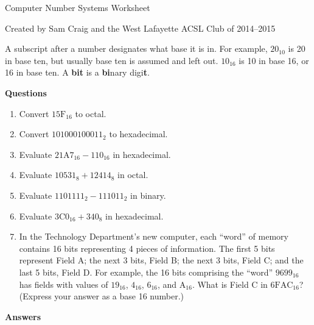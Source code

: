 \documentclass[12pt,letterpaper,fleqn]{article}
\begin{document}
\begin{center}
  Computer Number Systems Worksheet

  Created by Sam Craig and the West Lafayette ACSL Club of 2014--2015
\end{center}

A subscript after a number designates what base it is in.
For example, $20_{10}$ is 20 in base ten, but usually base ten is assumed and left out.
$10_{16}$ is 10 in base 16, or 16 in base ten.
A \textbf{bit} is a \textbf{bi}nary digi\textbf{t}.

\bigskip
\noindent \textbf{Questions}

\begin{enumerate}

\item Convert $15\text{F}_{16}$ to octal.

\item Convert $101000100011_2$ to hexadecimal.

\item Evaluate $21\text{A}7_{16} - 110_{16}$ in hexadecimal.

\item Evaluate $10531_8 + 12414_8$ in octal.

\item Evaluate $1101111_2 - 111011_2$ in binary.

\item Evaluate $3\text{C}0_{16} + 340_8$ in hexadecimal.

\item In the Technology Department's new computer, each ``word'' of memory
  contains 16 bits representing 4 pieces of information.
  The first 5 bits represent Field A; the next
  3 bits, Field B; the next 3 bits, Field C;
  and the last 5 bits, Field D.
  For example, the 16 bits comprising the ``word''
  $9699_{16}$ has fields with values of $19_{16}$, $4_{16}$,
  $6_{16}$, and $\text{A}_{16}$. What is Field C in $6\text{FAC}_{16}$? (Express your answer as
  a base 16 number.)

\end{enumerate}

\pagebreak

\noindent \textbf{Answers}
\end{document}

